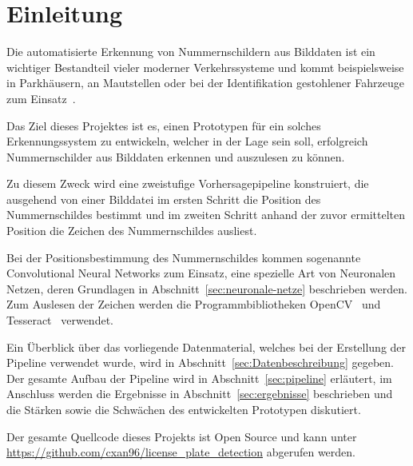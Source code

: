 \section{Einleitung}

Die automatisierte Erkennung von Nummernschildern aus Bilddaten
ist ein wichtiger Bestandteil vieler moderner Verkehrssysteme
und kommt beispielsweise in Parkh\"ausern, an Mautstellen
oder bei der Identifikation gestohlener Fahrzeuge zum
Einsatz~\cite{silva2018a}.

Das Ziel dieses Projektes ist es, einen Prototypen f\"ur ein solches
Erkennungssystem zu entwickeln, welcher in der
Lage sein soll, erfolgreich Nummernschilder aus Bilddaten erkennen
und auszulesen zu k\"onnen.

Zu diesem Zweck wird eine zweistufige Vorhersagepipeline konstruiert,
die ausgehend von einer Bilddatei im ersten Schritt die Position des
Nummernschildes bestimmt und im zweiten Schritt anhand der zuvor ermittelten
Position die Zeichen des Nummernschildes ausliest.

Bei der Positionsbestimmung des Nummernschildes kommen sogenannte
Convolutional Neural Networks zum Einsatz, eine spezielle Art von
Neuronalen Netzen, deren Grundlagen in Abschnitt~\ref{sec:neuronale-netze}
beschrieben werden. Zum Auslesen der Zeichen werden die
Programmbibliotheken OpenCV~\cite{opencv_library} und Tesseract~\cite{smith_2007}
verwendet.

Ein \"Uberblick \"uber das vorliegende Datenmaterial, welches
bei der Erstellung der Pipeline verwendet wurde, wird in
Abschnitt~\ref{sec:Datenbeschreibung} gegeben.
Der gesamte Aufbau der Pipeline wird in Abschnitt~\ref{sec:pipeline}
erl\"autert, im Anschluss werden die Ergebnisse in Abschnitt~\ref{sec:ergebnisse}
beschrieben und die St\"arken sowie die Schw\"achen des entwickelten
Prototypen diskutiert.

Der gesamte Quellcode dieses Projekts ist Open Source und kann
unter \url{https://github.com/cxan96/license_plate_detection}
abgerufen werden.
